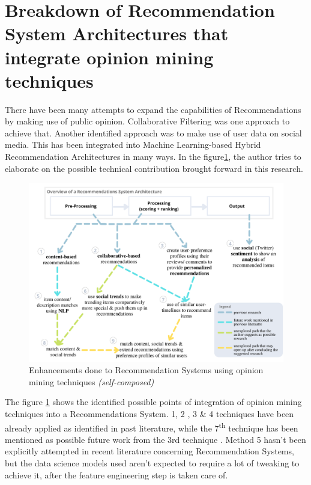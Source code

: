 \documentclass[manuscript,screen,natbib=false]{acmart}
\begin{document}




\section{Breakdown of Recommendation System Architectures that integrate opinion mining techniques}
There have been many attempts to expand the capabilities of Recommendations by making use of public opinion. Collaborative Filtering was one approach to achieve that. Another identified approach was to make use of user data on social media. This has been integrated into Machine Learning-based Hybrid Recommendation Architectures in many ways. In the figure\ref{fig:recommendation-opinion-mining-enhancements}, the author tries to elaborate on the possible technical contribution brought forward in this research.

\begin{figure}[h]
\centering
\includegraphics[width=\textwidth]{images/Enhanced_Recommendation_Systems.png}
\caption{Enhancements done to Recommendation Systems using opinion mining techniques \textit{(self-composed)}}
\label{fig:recommendation-opinion-mining-enhancements}
\end{figure}

The figure \ref{fig:recommendation-opinion-mining-enhancements} shows the identified possible points of integration of opinion mining techniques into a Recommendations System.
1, 2 \cite{linden_amazoncom_2003, larry_history_2019}, 3 \cite{cheng_hybrid_2020} \& 4 \cite{ayushi_cross-domain_2018} techniques have been already applied as identified in past literature, while the 7\textsuperscript{th} technique has been mentioned as possible future work from the 3rd technique \cite{chen_user_2019}. Method 5 hasn't been explicitly attempted in recent literature concerning Recommendation Systems, but the data science models used aren't expected to require a lot of tweaking to achieve it, after the feature engineering step is taken care of.
\end{document}
